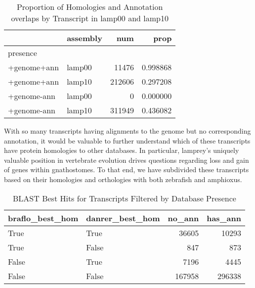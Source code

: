 \documentclass[10pt,twocolumn,linenumbers]{article}
\begin{document}
\begin{table*}[H]
\caption {Proportion of Homologies and Annotation overlaps by Transcript in lamp00 and lamp10}
\begin{center}

\begin{tabular}{llrr}
\toprule
{} & assembly &     num &      prop \\
\midrule
presence    &          &         &           \\
+genome+ann &   lamp00 &   11476 &  0.998868 \\
+genome+ann &   lamp10 &  212606 &  0.297208 \\
+genome-ann &   lamp00 &       0 &  0.000000 \\
+genome-ann &   lamp10 &  311949 &  0.436082 \\
\bottomrule
\end{tabular}



\end{center}
\end{table*}

With so many transcripts having alignments to the genome but no corresponding annotation, it would
be valuable to further understand which of these transcripts have protein homologies to other
databases. In particular, lamprey's uniquely valuable position in vertebrate evolution drives 
questions regarding loss and gain of genes within gnathostomes. To that end, we have subdivided 
these transcripts based on their homologies and orthologies with both zebrafish and amphioxus.


\begin{table*}[H]
\caption {BLAST Best Hits for Transcripts Filtered by Database Presence}
\begin{center}

\begin{tabular}{llrr}
\toprule
braflo\_best\_hom & danrer\_best\_hom &  no\_ann &  has\_ann \\
\midrule
           True &            True &   36605 &    10293 \\
           True &           False &     847 &      873 \\
          False &            True &    7196 &     4445 \\
          False &           False &  167958 &   296338 \\
\bottomrule
\end{tabular}



\end{center}
\end{table*}
\end{document}
